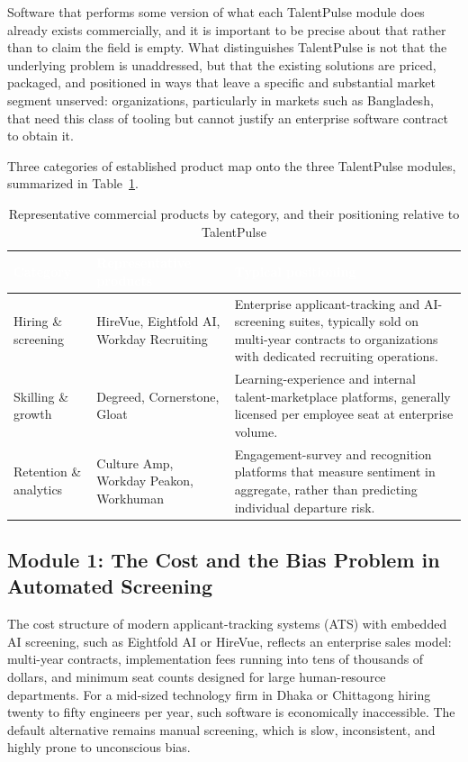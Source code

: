 \documentclass[11pt,a4paper]{article}
\newcommand{\hdrow}{\rowcolor{TPnavy}}
\newcommand{\hdtxt}[1]{\textcolor{white}{\bfseries #1}}
\begin{document}
Software that performs some version of what each TalentPulse module does already exists commercially, and it is important to be precise about that rather than to claim the field is empty. What distinguishes TalentPulse is not that the underlying problem is unaddressed, but that the existing solutions are priced, packaged, and positioned in ways that leave a specific and substantial market segment unserved: organizations, particularly in markets such as Bangladesh, that need this class of tooling but cannot justify an enterprise software contract to obtain it.

Three categories of established product map onto the three TalentPulse modules, summarized in Table~\ref{tab:competitors}.

\begin{table}[H]
\centering
\caption{Representative commercial products by category, and their positioning relative to TalentPulse}
\label{tab:competitors}
\small
\begin{tabular}{p{3.0cm}p{4.6cm}p{7.0cm}}
\toprule
\hdrow \hdtxt{Category} & \hdtxt{Representative products} & \hdtxt{Typical positioning} \\
\midrule
Hiring \& screening & HireVue, Eightfold AI, Workday Recruiting & Enterprise applicant-tracking and AI-screening suites, typically sold on multi-year contracts to organizations with dedicated recruiting operations. \\
\rowcolor{TPlight}
Skilling \& growth & Degreed, Cornerstone, Gloat & Learning-experience and internal talent-marketplace platforms, generally licensed per employee seat at enterprise volume. \\
Retention \& analytics & Culture Amp, Workday Peakon, Workhuman & Engagement-survey and recognition platforms that measure sentiment in aggregate, rather than predicting individual departure risk. \\
\bottomrule
\end{tabular}
\end{table}

\subsection{Module 1: The Cost and the Bias Problem in Automated Screening}
The cost structure of modern applicant-tracking systems (ATS) with embedded AI screening, such as Eightfold AI or HireVue, reflects an enterprise sales model: multi-year contracts, implementation fees running into tens of thousands of dollars, and minimum seat counts designed for large human-resource departments. For a mid-sized technology firm in Dhaka or Chittagong hiring twenty to fifty engineers per year, such software is economically inaccessible. The default alternative remains manual screening, which is slow, inconsistent, and highly prone to unconscious bias.
\end{document}

